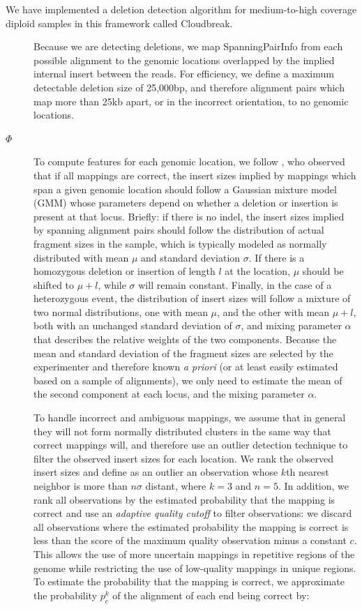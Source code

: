 \documentclass[11pt]{article}
\begin{document}
We have implemented a deletion detection algorithm for medium-to-high coverage diploid samples in this framework called Cloudbreak. 
\begin{description}
\item[] Because we are detecting deletions, we map SpanningPairInfo from each possible alignment to the genomic locations overlapped by the implied internal insert between the reads. For efficiency, we define a maximum detectable deletion size of 25,000bp, and therefore alignment pairs which map more than 25kb apart, or in the incorrect orientation, to no genomic locations.
\item[$\Phi$] To compute features for each genomic location, we follow \textcite{Lee:2009da}, who observed that if all mappings are correct, the insert sizes implied by mappings which span a given genomic location should follow a Gaussian mixture model (GMM) whose parameters depend on whether a deletion or insertion is present at that locus. Briefly: if there is no indel, the insert sizes implied by spanning alignment pairs should follow the distribution of actual fragment sizes in the sample, which is typically modeled as normally distributed with mean $\mu$ and standard deviation $\sigma$. If there is a homozygous deletion or insertion of length $l$ at the location, $\mu$ should be shifted to $\mu + l$, while $\sigma$ will remain constant. Finally, in the case of a heterozygous event, the distribution of insert sizes will follow a mixture of two normal distributions, one with mean $\mu$, and the other with mean $\mu + l$, both with an unchanged standard deviation of $\sigma$, and mixing parameter $\alpha$ that describes the relative weights of the two components. Because the mean and standard deviation of the fragment sizes are selected by the experimenter and therefore known \emph{a priori} (or at least easily estimated based on a sample of alignments), we only need to estimate the mean of the second component at each locus, and the mixing parameter $\alpha$.

To handle incorrect and ambiguous mappings, we assume that in general they will not form normally distributed clusters in the same way that correct mappings will, and therefore use an outlier detection technique to filter the observed insert sizes for each location. We rank the observed insert sizes and define as an outlier an observation whose $k$th nearest neighbor is more than $n\sigma$ distant, where $k = 3$ and $n = 5$. In addition, we rank all observations by the estimated probability that the mapping is correct and use an \emph{adaptive quality cutoff} to filter observations: we discard all observations where the estimated probability the mapping is correct is less than the score of the maximum quality observation minus a constant $c$. This allows the use of more uncertain mappings in repetitive regions of the genome while restricting the use of low-quality mappings in unique regions. To estimate the probability that the mapping is correct, we approximate the probability $p^{k}_c$ of the alignment of each end being correct by:


\end{description}
\end{document}
